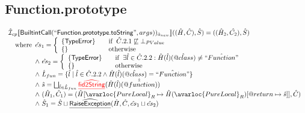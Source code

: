 \subsection{Function.prototype}
\[
\begin{array}{l}
\aI _{cp}\lbr \SF{BuiltintCall}(``\SF{Function.prototype.toString}",args))_{\hat{a}_{new}}\rbr((\hat{H},\hat{C}), \hat{S})
  = ((\hat{H}_2, \hat{C_2}), \hat{S})\\
\quad\wherec{
  \hat{es}_1 =
    \left\{
    \begin{array}{l@{\quad\quad}l}
      \{ \SF{TypeError} \} & \ifc{\hat{C}.2.1 \not\sqsubseteq \bot_{PValue}}\\
      \{ \}& \owc\\
    \end{array}
    \right.\\
  \land\ \hat{es}_2 =
    \left\{
    \begin{array}{l@{\quad\quad}l}
      \{ \SF{TypeError} \}
      & \ifc{\exists \hat{l} \in \hat{C}.2.2: \hat{H}(\hat{l})(\avarprop{class})\neq \hat{``Function"}}\\
      \{ \}& \owc\\
    \end{array}
    \right.\\
  \land\ \hat{L}_{fun} = \{\hat{l} \mid \hat{l} \in \hat{C}.2.2 \land \hat{H}(\hat{l})(\avarprop{class}) =  \hat{``Function"}\}\\
  \land\ \hat{s} = \bigsqcup_{\hat{l} \in \hat{L}_{fun}}
    {\inred \ahf{fid2String}}(\hat{H}(\hat{l})(\hat{\avarprop{function}}))\\
  \land\ (\hat{H}_1, \hat{C}_1) = 
      (\hat{H}[\avarloc{PureLocal}_R \mapsto \hat{H}(\avarloc{PureLocal}_R)[\varprop{return} \mapsto \hat{s}]], \hat{C})\\
  \land\ \hat{S}_1 = \hat{S} \sqcup \ahf{RaiseException}(\hat{H}, \hat{C}, \hat{es}_1 \sqcup \hat{es}_2)\\
  }\\
\\\\




\end{array}\]
